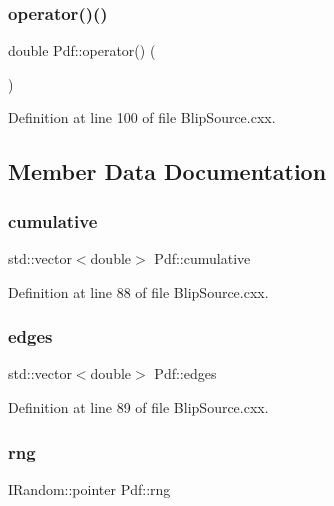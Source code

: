 \subsubsection{\texorpdfstring{operator()()}{operator()()}}
{\footnotesize\ttfamily double Pdf\+::operator() (\begin{DoxyParamCaption}{ }\end{DoxyParamCaption})\hspace{0.3cm}{\ttfamily [inline]}}



Definition at line 100 of file Blip\+Source.\+cxx.



\subsection{Member Data Documentation}
\mbox{\label{struct_pdf_a8a2c4cffa10d152bf88741f1b60cbfb2}} 
\subsubsection{\texorpdfstring{cumulative}{cumulative}}
{\footnotesize\ttfamily std\+::vector$<$double$>$ Pdf\+::cumulative}



Definition at line 88 of file Blip\+Source.\+cxx.

\mbox{\label{struct_pdf_a57275ab1190b2639e67f539c888412e5}} 
\subsubsection{\texorpdfstring{edges}{edges}}
{\footnotesize\ttfamily std\+::vector$<$double$>$ Pdf\+::edges}



Definition at line 89 of file Blip\+Source.\+cxx.

\mbox{\label{struct_pdf_a7e63961db385abed7be8af1d991a001c}} 
\subsubsection{\texorpdfstring{rng}{rng}}
{\footnotesize\ttfamily I\+Random\+::pointer Pdf\+::rng}



